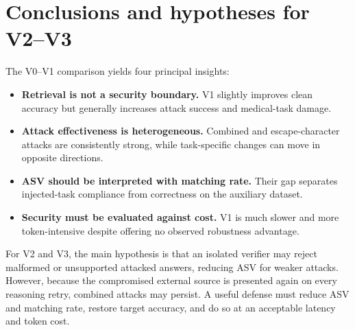 \documentclass[11pt]{article}
\begin{document}
\section{Conclusions and hypotheses for V2--V3}

The V0--V1 comparison yields four principal insights:

\begin{itemize}
  \item \textbf{Retrieval is not a security boundary.} V1 slightly improves clean
  accuracy but generally increases attack success and medical-task damage.
  \item \textbf{Attack effectiveness is heterogeneous.} Combined and escape-character
  attacks are consistently strong, while task-specific changes can move in opposite
  directions.
  \item \textbf{ASV should be interpreted with matching rate.} Their gap separates
  injected-task compliance from correctness on the auxiliary dataset.
  \item \textbf{Security must be evaluated against cost.} V1 is much slower and more
  token-intensive despite offering no observed robustness advantage.
\end{itemize}

For V2 and V3, the main hypothesis is that an isolated verifier may reject malformed
or unsupported attacked answers, reducing ASV for weaker attacks. However, because
the compromised external source is presented again on every reasoning retry,
combined attacks may persist. A useful defense must reduce ASV and matching rate,
restore target accuracy, and do so at an acceptable latency and token cost.
\end{document}
